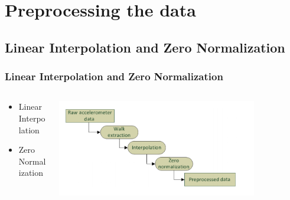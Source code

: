\documentclass{beamer}
\begin{document}
%	
%				



\section[Preprocessing the data]{Preprocessing the data}
\subsection{Linear Interpolation and Zero Normalization}
\begin{frame}
  \frametitle{Linear Interpolation and Zero Normalization}

  \begin{columns}
  \begin{column}{0.4\textwidth}
  \begin{itemize}
  	\item Linear Interpolation
  	\linebreak
	\item Zero Normalization 
  \end{itemize}
  \end{column}
  \begin{column}{0.8\textwidth}
   \includegraphics[width=0.8\textwidth]{Illustrations/chart1.png}
       \\
  \end{column}
  \end{columns}
\end{frame}
\end{document}
